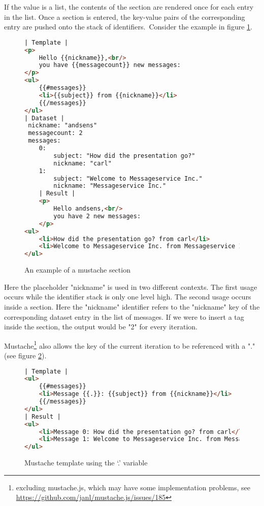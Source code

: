 \documentclass[thesis.tex]{subfiles}
\begin{document}
If the value is a list, the contents of the section are rendered once for each
entry in the list. Once a section is entered, the key-value pairs of the
corresponding entry are pushed onto the stack of identifiers.\
Consider the example in figure \ref{fig:section.mustache}.
\begin{figure}
	\centering
	\caption{An example of a mustache section}
	\label{fig:section.mustache}
	\begin{lstlisting}[language=HTML]
| Template |
<p>
	Hello {{nickname}},<br/>
	you have {{messagecount}} new messages:
</p>
<ul>
	{{#messages}}
	<li>{{subject}} from {{nickname}}</li>
	{{/messages}}
</ul>
| Dataset |
 nickname: "andsens"
 messagecount: 2
 messages:
 	0:
 		subject: "How did the presentation go?"
 		nickname: "carl"
 	1:
 		subject: "Welcome to Messageservice Inc."
 		nickname: "Messageservice Inc."
	| Result |
	<p>
		Hello andsens,<br/>
		you have 2 new messages:
	</p>
<ul>
	<li>How did the presentation go? from carl</li>
	<li>Welcome to Messageservice Inc. from Messageservice Inc.</li>
</ul>
	\end{lstlisting}
\end{figure}
Here the placeholder "nickname" is used in two different contexts.
The first usage occurs while the identifier stack is only one level high.
The second usage occurs inside a section. Here the "nickname" identifier refers
to the "nickname" key of the corresponding dataset entry in the list of messages.
If we were to insert a \inline{\{\{messagecount\}\}} tag inside the section,
the output would be "2" for every iteration.

Mustache\footnote{excluding mustache.js, which may have some implementation
problems, see \url{https://github.com/janl/mustache.js/issues/185}} also allows
the key of the current iteration to
be referenced with a "." (see figure \ref{fig:dot-oper.mustache}).
\begin{figure}
	\centering
	\caption{Mustache template using the `.' variable}
	\label{fig:dot-oper.mustache}
	\begin{lstlisting}[language=HTML]
| Template |
<ul>
	{{#messages}}
	<li>Message {{.}}: {{subject}} from {{nickname}}</li>
	{{/messages}}
</ul>
| Result |
<ul>
	<li>Message 0: How did the presentation go? from carl</li>
	<li>Message 1: Welcome to Messageservice Inc. from Messageservice Inc.</li>
</ul>
	\end{lstlisting}
\end{figure}
\end{document}
